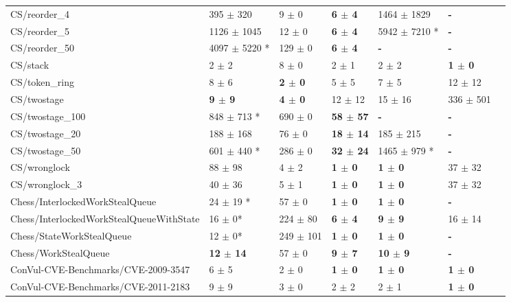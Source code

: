 \begin{table}
\begin{spacing}{1.5}
\begin{tabular}{lllllll}
CS/reorder\_4 & 395  $\pm$ 320  & 9  $\pm$ 0  & \textbf{ 6  $\pm$ 4  } & 1464  $\pm$ 1829  & \textbf{ - }  \\
CS/reorder\_5 & 1126  $\pm$ 1045  & 12  $\pm$ 0  & \textbf{ 6  $\pm$ 4  } & 5942  $\pm$ 7210 * & \textbf{ - }  \\
CS/reorder\_50 & 4097  $\pm$ 5220 * & 129  $\pm$ 0  & \textbf{ 6  $\pm$ 4  } & \textbf{ - } & \textbf{ - }  \\
CS/stack & 2  $\pm$ 2  & 8  $\pm$ 0  & 2  $\pm$ 1  & 2  $\pm$ 2  & \textbf{ 1  $\pm$ 0  } \\
CS/token\_ring & 8  $\pm$ 6  & \textbf{ 2  $\pm$ 0  } & 5  $\pm$ 5  & 7  $\pm$ 5  & 12  $\pm$ 12   \\
CS/twostage & \textbf{ 9  $\pm$ 9  } & \textbf{ 4  $\pm$ 0  } & 12  $\pm$ 12  & 15  $\pm$ 16  & 336  $\pm$ 501   \\
CS/twostage\_100 & 848  $\pm$ 713 * & 690  $\pm$ 0  & \textbf{ 58  $\pm$ 57  } & \textbf{ - } & \textbf{ - }  \\
CS/twostage\_20 & 188  $\pm$ 168  & 76  $\pm$ 0  & \textbf{ 18  $\pm$ 14  } & 185  $\pm$ 215  & \textbf{ - }  \\
CS/twostage\_50 & 601  $\pm$ 440 * & 286  $\pm$ 0  & \textbf{ 32  $\pm$ 24  } & 1465  $\pm$ 979 * & \textbf{ - }  \\
CS/wronglock & 88  $\pm$ 98  & 4  $\pm$ 2  & \textbf{ 1  $\pm$ 0  } & \textbf{ 1  $\pm$ 0  } & 37  $\pm$ 32  \\
CS/wronglock\_3 & 40  $\pm$ 36  & 5  $\pm$ 1  & \textbf{ 1  $\pm$ 0  } & \textbf{ 1  $\pm$ 0  } & 37  $\pm$ 32   \\
Chess/InterlockedWorkStealQueue & 24  $\pm$ 19 * & 57  $\pm$ 0  & \textbf{ 1  $\pm$ 0  } & \textbf{ 1  $\pm$ 0  } & \textbf{ - }  \\
Chess/InterlockedWorkStealQueueWithState & 16  $\pm$ 0* & 224  $\pm$ 80  & \textbf{ 6  $\pm$ 4  } & \textbf{ 9  $\pm$ 9  } & 16  $\pm$ 14   \\
Chess/StateWorkStealQueue & 12  $\pm$ 0* & 249  $\pm$ 101  & \textbf{ 1  $\pm$ 0  } & \textbf{ 1  $\pm$ 0  } & \textbf{ - }  \\
Chess/WorkStealQueue & \textbf{ 12  $\pm$ 14  } & 57  $\pm$ 0  & \textbf{ 9  $\pm$ 7  } & \textbf{ 10  $\pm$ 9  } & \textbf{ - } \\
ConVul-CVE-Benchmarks/CVE-2009-3547 & 6  $\pm$ 5  & 2  $\pm$ 0  & \textbf{ 1  $\pm$ 0  } & \textbf{ 1  $\pm$ 0  } & \textbf{ 1  $\pm$ 0  } \\
ConVul-CVE-Benchmarks/CVE-2011-2183 & 9  $\pm$ 9  & 3  $\pm$ 0  & 2  $\pm$ 2  & 2  $\pm$ 1  & \textbf{ 1  $\pm$ 0  } \\

\end{tabular}
\end{spacing}
\end{table}
